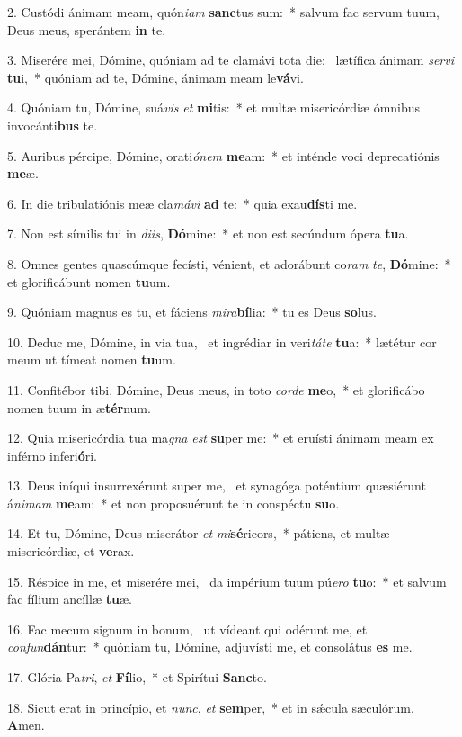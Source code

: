 2. Custódi ánimam meam, quón\textit{i}\textit{am} \textbf{sanc}tus sum:~*  salvum fac servum tuum, Deus meus, sperántem \textbf{in} te.\

3. Miserére mei, Dómine, quóniam ad te clamávi tota die: \dag\  lætífica ánimam \textit{ser}\textit{vi} \textbf{tu}i,~*  quóniam ad te, Dómine, ánimam meam le\textbf{vá}vi.\

4. Quóniam tu, Dómine, suá\textit{vis} \textit{et} \textbf{mi}tis:~*  et multæ misericórdiæ ómnibus invocánti\textbf{bus} te.\

5. Auribus pércipe, Dómine, orati\textit{ó}\textit{nem} \textbf{me}am:~*  et inténde voci deprecatiónis \textbf{me}æ.\

6. In die tribulatiónis meæ cla\textit{má}\textit{vi} \textbf{ad} te:~*  quia exau\textbf{dís}ti me.\

7. Non est símilis tui in \textit{di}\textit{is}, \textbf{Dó}mine:~*  et non est secúndum ópera \textbf{tu}a.\

8. Omnes gentes quascúmque fecísti, vénient, et adorábunt co\textit{ram} \textit{te}, \textbf{Dó}mine:~*  et glorificábunt nomen \textbf{tu}um.\

9. Quóniam magnus es tu, et fáciens \textit{mi}\textit{ra}\textbf{bí}lia:~*  tu es Deus \textbf{so}lus.\

10. Deduc me, Dómine, in via tua, \dag\  et ingrédiar in veri\textit{tá}\textit{te} \textbf{tu}a:~*  lætétur cor meum ut tímeat nomen \textbf{tu}um.\

11. Confitébor tibi, Dómine, Deus meus, in toto \textit{cor}\textit{de} \textbf{me}o,~*  et glorificábo nomen tuum in æ\textbf{tér}num.\

12. Quia misericórdia tua ma\textit{gna} \textit{est} \textbf{su}per me:~*  et eruísti ánimam meam ex inférno inferi\textbf{ó}ri.\

13. Deus iníqui insurrexérunt super me, \dag\  et synagóga poténtium quæsiérunt á\textit{ni}\textit{mam} \textbf{me}am:~*  et non proposuérunt te in conspéctu \textbf{su}o.\

14. Et tu, Dómine, Deus miserátor \textit{et} \textit{mi}\textbf{sé}ricors,~*  pátiens, et multæ misericórdiæ, et \textbf{ve}rax.\

15. Réspice in me, et miserére mei, \dag\  da impérium tuum pú\textit{e}\textit{ro} \textbf{tu}o:~*  et salvum fac fílium ancíllæ \textbf{tu}æ.\

16. Fac mecum signum in bonum, \dag\  ut vídeant qui odérunt me, et \textit{con}\textit{fun}\textbf{dán}tur:~*  quóniam tu, Dómine, adjuvísti me, et consolátus \textbf{es} me.\

17. Glória Pa\textit{tri}, \textit{et} \textbf{Fí}lio,~*  et Spirítui \textbf{Sanc}to.\

18. Sicut erat in princípio, et \textit{nunc}, \textit{et} \textbf{sem}per,~*  et in sǽcula sæculórum. \textbf{A}men.\

